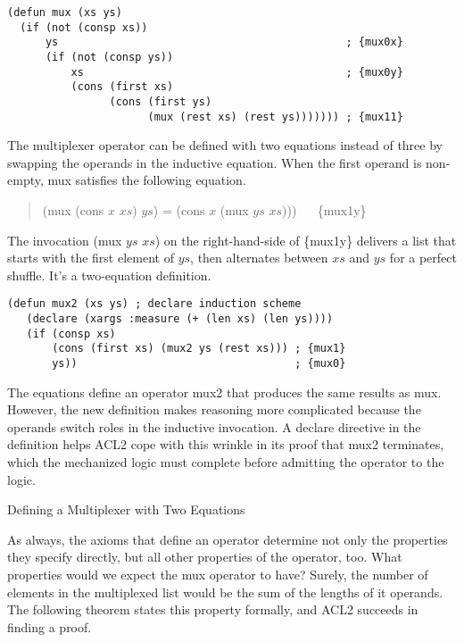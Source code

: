 \label{mux-defun}
\begin{Verbatim}
(defun mux (xs ys)
  (if (not (consp xs))
      ys                                             ; {mux0x}
      (if (not (consp ys))
          xs                                         ; {mux0y}
          (cons (first xs)
                (cons (first ys)
                      (mux (rest xs) (rest ys))))))) ; {mux11}
\end{Verbatim}

\begin{aside}
The multiplexer operator can be defined with two equations instead of three
by swapping the operands in the inductive equation.
When the first operand is non-empty, \textsf{mux} satisfies the following equation.
\begin{quote}
\textsf{(mux (cons $x$ $xs$) $ys$) = (cons $x$ (mux $ys$ $xs$)))} ~~ \{mux1y\}
\end{quote}

The invocation \textsf{(mux $ys$ $xs$)}
on the right-hand-side of \{mux1y\}
delivers a list that starts with the first element of $ys$,
then alternates between $xs$ and $ys$
for a perfect shuffle.
It's a two-equation definition.

\label{mux-2eq-defun}
\begin{Verbatim}
(defun mux2 (xs ys) ; declare induction scheme
   (declare (xargs :measure (+ (len xs) (len ys))))
   (if (consp xs)
       (cons (first xs) (mux2 ys (rest xs))) ; {mux1}
       ys))                                  ; {mux0}
\end{Verbatim}

The equations define an operator \textsf{mux2} that produces
the same results as \textsf{mux}.
However, the new definition makes reasoning more complicated
because the operands switch roles in the inductive invocation.
A \textsf{declare} directive in the definition
helps ACL2 cope with this wrinkle in its
proof that \textsf{mux2} terminates,
which the mechanized logic must complete before
admitting the operator to the logic.
\caption{Defining a Multiplexer with Two Equations}
\label{aside:mux-2eq}
\end{aside}

As always, the axioms that define an operator
determine not only the properties they specify directly,
but all other properties of the operator, too.
What properties would we expect the \textsf{mux} operator to have?
Surely, the number of elements in the multiplexed list
would be the sum of the lengths of it operands.
The following theorem states this property formally,
and ACL2 succeeds in finding a proof.

